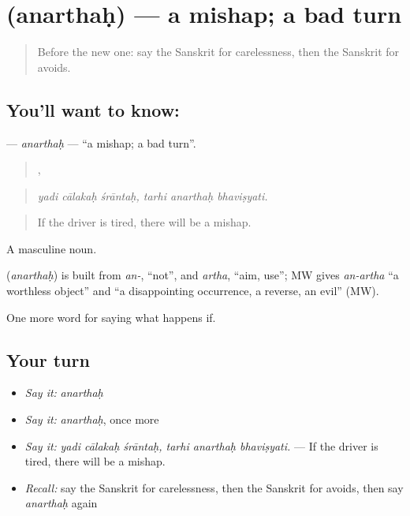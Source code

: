 \section[\texorpdfstring{\sk{अनर्थः} (anarthaḥ)}{अनर्थः (anarthaḥ)}]{ (anarthaḥ) — a mishap; a bad turn}

\label{lesson:SA-C374-anarthah}



\begin{quote}
Before the new one: say the Sanskrit for carelessness, then the Sanskrit for avoids.
\end{quote}

\subsection*{You'll want to know: }
\textbf{} — \emph{anarthaḥ} — \textquotedblleft{}a mishap; a bad turn\textquotedblright{}.

\begin{quote}
  ,   
\end{quote}

\begin{quote}
\emph{yadi cālakaḥ śrāntaḥ, tarhi anarthaḥ bhaviṣyati.}
\end{quote}

\begin{quote}
If the driver is tired, there will be a mishap.
\end{quote}

A masculine noun.

\begin{cousinweb}
\textbf{} (\emph{anarthaḥ}) is built from \emph{an-}, \textquotedblleft{}not\textquotedblright{}, and \emph{artha}, \textquotedblleft{}aim, use\textquotedblright{}; MW gives \emph{an-artha} \textquotedblleft{}a worthless object\textquotedblright{} and \textquotedblleft{}a disappointing occurrence, a reverse, an evil\textquotedblright{} (MW).
\end{cousinweb}

\begin{grammarlens}[title={What you've built}]
One more word for saying what happens if.
\end{grammarlens}

\subsection*{Your turn}
\begin{itemize}
\raggedright
  \item \emph{Say it:} \emph{anarthaḥ}
  \item \emph{Say it:} \emph{anarthaḥ}, once more
  \item \emph{Say it:} \emph{yadi cālakaḥ śrāntaḥ, tarhi anarthaḥ bhaviṣyati.} — If the driver is tired, there will be a mishap.
  \item \emph{Recall:} say the Sanskrit for carelessness, then the Sanskrit for avoids, then say \emph{anarthaḥ} again
\end{itemize}

